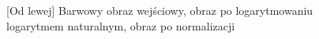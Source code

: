 \documentclass[a4paper,12pt, titlepage]{report}
\begin{document}
\FloatBarrier
\begin{figure}[h]
    \centering
    \caption{[Od lewej] Barwowy obraz wejściowy, obraz po logarytmowaniu logarytmem naturalnym, obraz po normalizacji}%
    \label{fig:rysunek}%
\end{figure}
\FloatBarrier
\end{document}
